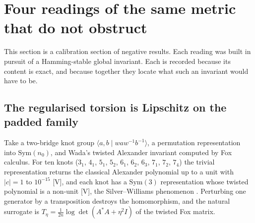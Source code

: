 \documentclass[11pt]{article}
\theoremstyle{remark}\newtheorem{remark}[theorem]{Remark}
\newcommand{\Sym}{\mathrm{Sym}}\newcommand{\dH}{d_H}\newcommand{\F}{\mathbb{F}}\newcommand{\Z}{\mathbb{Z}}
\begin{document}
\section{Four readings of the same metric that do not obstruct}\label{sec:readings}
This section is a calibration section of negative results. Each reading was built in pursuit of a Hamming-stable global invariant. Each is recorded because its content is exact, and because together they locate what such an invariant would have to be.

\subsection{The regularised torsion is Lipschitz on the padded family}
Take a two-bridge knot group $\langle a,b\mid waw^{-1}b^{-1}\rangle$, a permutation representation into $\Sym(n_0)$, and Wada's twisted Alexander invariant computed by Fox calculus. For ten knots ($3_1$, $4_1$, $5_1$, $5_2$, $6_1$, $6_2$, $6_3$, $7_1$, $7_2$, $7_4$) the trivial representation returns the classical Alexander polynomial up to a unit with $|c|=1$ to $10^{-15}$ [V], and each knot has a $\Sym(3)$ representation whose twisted polynomial is a non-unit [V], the Silver--Williams phenomenon \cite{SW}. Perturbing one generator by a transposition destroys the homomorphism, and the natural surrogate is $T_\eta=\frac1{2n}\log\det(A^*A+\eta^2 I)$ of the twisted Fox matrix.
\end{document}
